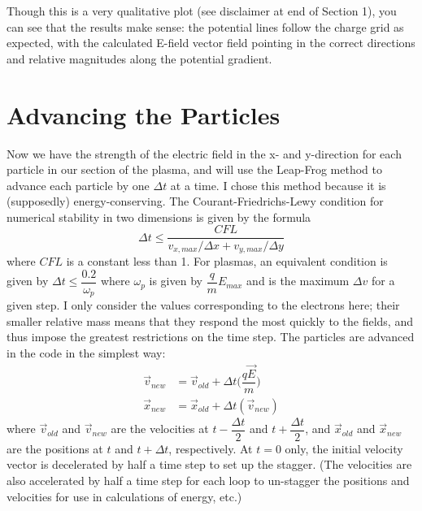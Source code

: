 \documentclass{article}
\begin{document}
Though this is a very qualitative plot (see disclaimer at end of Section 1), you can see that the results make sense: the potential lines follow the charge grid as expected, with the calculated E-field vector field pointing in the correct directions and relative magnitudes along the potential gradient. 

\section{Advancing the Particles}
Now we have the strength of the electric field in the x- and y-direction for each particle in our section of the plasma, and will use the Leap-Frog method to advance each particle by one $\Delta t$ at a time. I chose this method because it is (supposedly) energy-conserving. \newline
The Courant-Friedrichs-Lewy condition for numerical stability in two dimensions is given by the formula 
\begin{equation}
\Delta t \leq \dfrac{CFL}{v_{x,max}/\Delta x + v_{y,max}/\Delta y}
\end{equation}
where $CFL$ is a constant less than 1. For plasmas, an equivalent condition is given by $\Delta t \leq \dfrac{0.2}{\omega_p}$ where $\omega_p$ is given by $\dfrac{q}{m}E_{max}$ and is the maximum $\Delta v$ for a given step. I only consider the values corresponding to the electrons here; their smaller relative mass means that they respond the most quickly to the fields, and thus impose the greatest restrictions on the time step. \newline \newline
The particles are advanced in the code in the simplest way: 
\begin{equation}
\begin{split}
\vec{v}_{new} &= \vec{v}_{old} + \Delta t\Big(\dfrac{q\vec{E}}{m}\Big) \\
\vec{x}_{new} &= \vec{x}_{old} + \Delta t(\vec{v}_{new})
\end{split}
\end{equation}
where $\vec{v}_{old}$ and $\vec{v}_{new}$ are the velocities at $t-\dfrac{\Delta t}{2}$ and $t + \dfrac{\Delta t}{2}$, and $\vec{x}_{old}$ and $\vec{x}_{new}$ are the positions at $t$ and $t + \Delta t$, respectively. At $t=0$ only, the initial velocity vector is decelerated by half a time step to set up the stagger. (The velocities are also accelerated by half a time step for each loop to un-stagger the positions and velocities for use in calculations of energy, etc.) 
\end{document}
